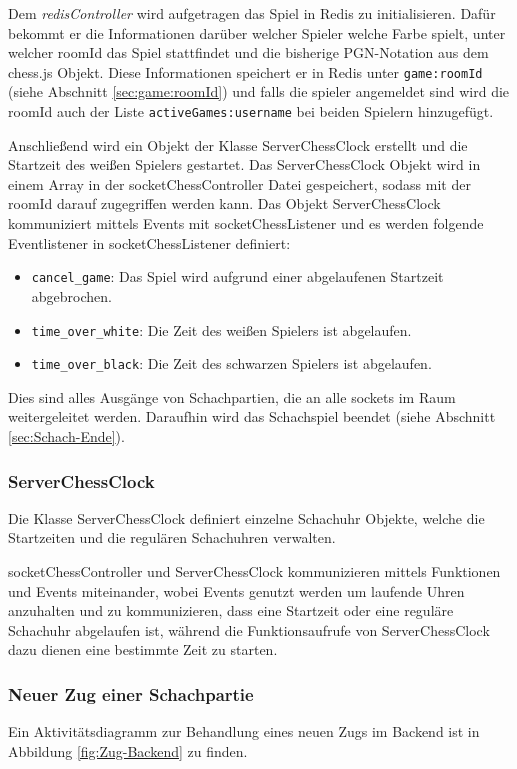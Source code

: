 Dem \textit{redisController} wird aufgetragen das Spiel in Redis zu initialisieren. Dafür bekommt er die Informationen darüber welcher Spieler welche Farbe spielt, unter welcher roomId das Spiel stattfindet und die bisherige PGN-Notation aus dem chess.js Objekt. Diese Informationen speichert er in Redis unter \verb|game:roomId| (siehe Abschnitt \ref{sec:game:roomId}) und falls die spieler angemeldet sind wird die roomId auch der Liste \verb|activeGames:username| bei beiden Spielern hinzugefügt.

Anschließend wird ein Objekt der Klasse ServerChessClock erstellt und die Startzeit des weißen Spielers gestartet. Das ServerChessClock Objekt wird in einem Array in der socketChessController Datei gespeichert, sodass mit der roomId darauf zugegriffen werden kann. Das Objekt ServerChessClock kommuniziert mittels Events mit socketChessListener und es werden folgende Eventlistener in socketChessListener definiert:
\begin{itemize}
\item \verb|cancel_game|: Das Spiel wird aufgrund einer abgelaufenen Startzeit abgebrochen.
\item \verb|time_over_white|:  Die Zeit des weißen Spielers ist abgelaufen.
\item \verb|time_over_black|:  Die Zeit des schwarzen Spielers ist abgelaufen.
\end{itemize}

Dies sind alles Ausgänge von Schachpartien, die an alle sockets im Raum weitergeleitet werden. Daraufhin wird das Schachspiel beendet (siehe Abschnitt \ref{sec:Schach-Ende}).

\subsubsection{ServerChessClock}
Die Klasse ServerChessClock definiert einzelne Schachuhr Objekte, welche die Startzeiten und die regulären Schachuhren verwalten.

socketChessController und ServerChessClock kommunizieren mittels Funktionen und Events miteinander, wobei Events genutzt werden um laufende Uhren anzuhalten und zu kommunizieren, dass eine Startzeit oder eine reguläre Schachuhr abgelaufen ist, während die Funktionsaufrufe von ServerChessClock dazu dienen eine bestimmte Zeit zu starten. 

\subsubsection{Neuer Zug einer Schachpartie}
\label{sec:Zug-Backend}
Ein Aktivitätsdiagramm zur Behandlung eines neuen Zugs im Backend ist in Abbildung \ref{fig:Zug-Backend} zu finden. 


